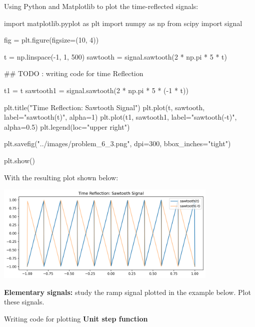 \documentclass[a4paper, 10pt]{article}
\begin{document}
\begin{solution}
Using Python and Matplotlib to plot the time-reflected signals:
\begin{codingbox}
import matplotlib.pyplot as plt
import numpy as np
from scipy import signal

fig = plt.figure(figsize=(10, 4))

t = np.linspace(-1, 1, 500)
sawtooth = signal.sawtooth(2 * np.pi * 5 * t)

## TODO : writing code for time Reflection

t1 = t
sawtooth1 = signal.sawtooth(2 * np.pi * 5 * (-1 * t))

plt.title("Time Reflection: Sawtooth Signal")
plt.plot(t, sawtooth, label="sawtooth(t)", alpha=1)
plt.plot(t1, sawtooth1, label="sawtooth(-t)", alpha=0.5)
plt.legend(loc="upper right")

plt.savefig("../images/problem_6_3.png", dpi=300, bbox_inches="tight")

plt.show()
\end{codingbox}

With the resulting plot shown below:
\begin{center}
    \includegraphics[width=0.8\textwidth]{images/problem_6_3.png}
\end{center}
\end{solution}

\newpage

\begin{problem}
\textbf{Elementary signals:} study the ramp signal plotted in the example below.
Plot these signals.
\end{problem}

\begin{subproblems}
    \item Writing code for plotting \textbf{Unit step function}
\end{subproblems}
\end{document}
